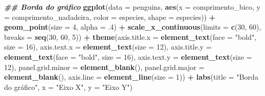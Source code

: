 \documentclass[
]{article}
\newenvironment{Shaded}{\begin{snugshade}}{\end{snugshade}}
\newcommand{\AttributeTok}[1]{\textcolor[rgb]{0.13,0.29,0.53}{#1}}
\newcommand{\DecValTok}[1]{\textcolor[rgb]{0.00,0.00,0.81}{#1}}
\newcommand{\DocumentationTok}[1]{\textcolor[rgb]{0.56,0.35,0.01}{\textbf{\textit{#1}}}}
\newcommand{\FunctionTok}[1]{\textcolor[rgb]{0.13,0.29,0.53}{\textbf{#1}}}
\newcommand{\NormalTok}[1]{#1}
\newcommand{\SpecialCharTok}[1]{\textcolor[rgb]{0.81,0.36,0.00}{\textbf{#1}}}
\newcommand{\StringTok}[1]{\textcolor[rgb]{0.31,0.60,0.02}{#1}}
\begin{document}
\begin{Shaded}
\begin{Highlighting}[]
\DocumentationTok{\#\# Borda do gráfico}
\FunctionTok{ggplot}\NormalTok{(}\AttributeTok{data =}\NormalTok{ penguins, }
       \FunctionTok{aes}\NormalTok{(}\AttributeTok{x =}\NormalTok{ comprimento\_bico, }\AttributeTok{y =}\NormalTok{ comprimento\_nadadeira,}
           \AttributeTok{color =}\NormalTok{ especies, }\AttributeTok{shape =}\NormalTok{ especies)) }\SpecialCharTok{+}
    \FunctionTok{geom\_point}\NormalTok{(}\AttributeTok{size =} \DecValTok{4}\NormalTok{, }\AttributeTok{alpha =}\NormalTok{ .}\DecValTok{4}\NormalTok{) }\SpecialCharTok{+}
    \FunctionTok{scale\_x\_continuous}\NormalTok{(}\AttributeTok{limits =} \FunctionTok{c}\NormalTok{(}\DecValTok{30}\NormalTok{, }\DecValTok{60}\NormalTok{), }\AttributeTok{breaks =} \FunctionTok{seq}\NormalTok{(}\DecValTok{30}\NormalTok{, }\DecValTok{60}\NormalTok{, }\DecValTok{5}\NormalTok{)) }\SpecialCharTok{+}
    \FunctionTok{theme}\NormalTok{(}\AttributeTok{axis.title.x =} \FunctionTok{element\_text}\NormalTok{(}\AttributeTok{face =} \StringTok{"bold"}\NormalTok{, }\AttributeTok{size =} \DecValTok{16}\NormalTok{),}
          \AttributeTok{axis.text.x =} \FunctionTok{element\_text}\NormalTok{(}\AttributeTok{size =} \DecValTok{12}\NormalTok{),}
          \AttributeTok{axis.title.y =} \FunctionTok{element\_text}\NormalTok{(}\AttributeTok{face =} \StringTok{"bold"}\NormalTok{, }\AttributeTok{size =} \DecValTok{16}\NormalTok{),}
          \AttributeTok{axis.text.y =} \FunctionTok{element\_text}\NormalTok{(}\AttributeTok{size =} \DecValTok{12}\NormalTok{),}
          \AttributeTok{panel.grid.minor =} \FunctionTok{element\_blank}\NormalTok{(),}
          \AttributeTok{panel.grid.major =} \FunctionTok{element\_blank}\NormalTok{(),}
          \AttributeTok{axis.line =} \FunctionTok{element\_line}\NormalTok{(}\AttributeTok{size =} \DecValTok{1}\NormalTok{)) }\SpecialCharTok{+}
    \FunctionTok{labs}\NormalTok{(}\AttributeTok{title =} \StringTok{"Borda do gráfico"}\NormalTok{, }\AttributeTok{x =} \StringTok{"Eixo X"}\NormalTok{, }\AttributeTok{y =} \StringTok{"Eixo Y"}\NormalTok{)}
\end{Highlighting}
\end{Shaded}
\end{document}
